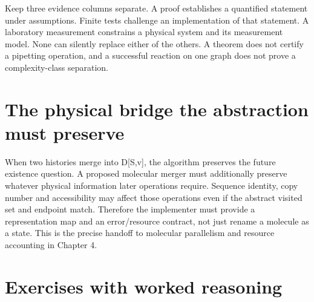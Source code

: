 Keep three evidence columns separate. A proof establishes a quantified
statement under assumptions. Finite tests challenge an implementation of
that statement. A laboratory measurement constrains a physical system
and its measurement model. None can silently replace either of the
others. A theorem does not certify a pipetting operation, and a
successful reaction on one graph does not prove a complexity-class
separation.

\section{The physical bridge the abstraction must
preserve}\label{the-physical-bridge-the-abstraction-must-preserve}


When two histories merge into D{[}S,v{]}, the algorithm preserves the
future existence question. A proposed molecular merger must additionally
preserve whatever physical information later operations require.
Sequence identity, copy number and accessibility may affect those
operations even if the abstract visited set and endpoint match.
Therefore the implementer must provide a representation map and an
error/resource contract, not just rename a molecule as a state. This is
the precise handoff to molecular parallelism and resource accounting in
Chapter 4.

\section{Exercises with worked
reasoning}\label{exercises-with-worked-reasoning}

